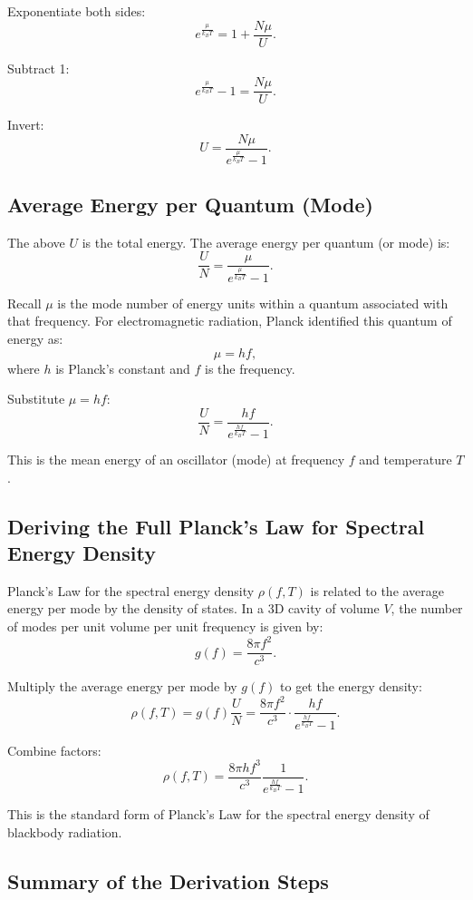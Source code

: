 \documentclass{article}
\begin{document}
Exponentiate both sides:
\[
e^{\frac{\mu}{k_B T}} = 1 + \frac{N\mu}{U}.
\]

Subtract 1:
\[
e^{\frac{\mu}{k_B T}} - 1 = \frac{N\mu}{U}.
\]

Invert:
\[
U = \frac{N\mu}{e^{\frac{\mu}{k_B T}} - 1}.
\]

\subsection*{Average Energy per Quantum (Mode)}

The above $U$ is the total energy. The average energy per quantum (or mode) is:
\[
\frac{U}{N} = \frac{\mu}{e^{\frac{\mu}{k_B T}} - 1}.
\]

Recall $\mu$ is the mode number of energy units within a quantum associated with that frequency. For electromagnetic radiation, Planck identified this quantum of energy as:
\[
\mu = hf,
\]
where $h$ is Planck’s constant and $f$ is the frequency.

Substitute $\mu = hf$:
\[
\frac{U}{N} = \frac{hf}{e^{\frac{hf}{k_B T}} - 1}.
\]

This is the mean energy of an oscillator (mode) at frequency $f$ and temperature $T$.

\subsection*{Deriving the Full Planck’s Law for Spectral Energy Density}

Planck’s Law for the spectral energy density $\rho(f,T)$ is related to the average energy per mode by the density of states. In a 3D cavity of volume $V$, the number of modes per unit volume per unit frequency is given by:
\[
g(f) = \frac{8\pi f^2}{c^3}.
\]

Multiply the average energy per mode by $g(f)$ to get the energy density:
\[
\rho(f,T) = g(f)\frac{U}{N} = \frac{8\pi f^2}{c^3} \cdot \frac{hf}{e^{\frac{hf}{k_B T}} - 1}.
\]

Combine factors:
\[
\rho(f,T) = \frac{8\pi h f^3}{c^3}\frac{1}{e^{\frac{hf}{k_B T}} - 1}.
\]

This is the standard form of Planck’s Law for the spectral energy density of blackbody radiation.

\subsection*{Summary of the Derivation Steps}
\end{document}
